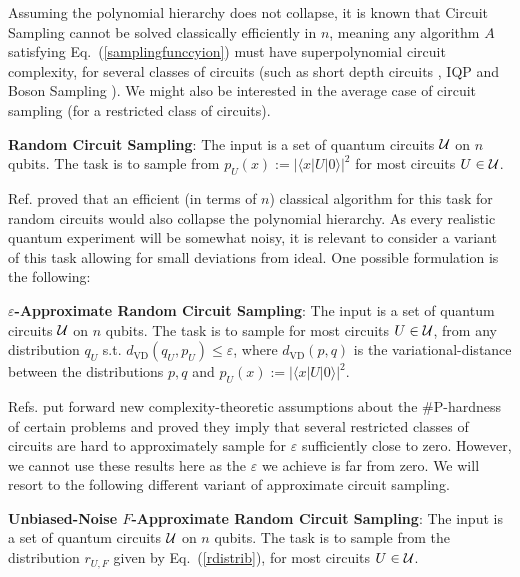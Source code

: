 Assuming the polynomial hierarchy does not collapse, it is known that Circuit Sampling cannot be solved classically efficiently in $n$, meaning any algorithm $A$ satisfying Eq.~(\ref{samplingfunccyion}) must have superpolynomial circuit complexity, for several classes of circuits (such as short depth circuits \cite{TD02}, IQP \cite{BJS10} and Boson Sampling \cite{AA11}). We might also be interested in the average case of circuit sampling (for a restricted class of circuits).

\vspace{0.2 cm}


\noindent \textbf{Random Circuit Sampling}: The input is a set of quantum circuits ${\cal U}$ on $n$ qubits. The task is to sample from $p_U(x) := |\langle x | U | 0 \rangle|^2$ for most circuits $U \in {\cal U}$. 

\vspace{0.2 cm}


Ref. \cite{Bou19} proved that an efficient (in terms of $n$) classical algorithm for this task for random circuits would also collapse the polynomial hierarchy. As every realistic quantum experiment will be somewhat noisy, it is relevant to consider a variant of this task allowing for small deviations from ideal. One possible formulation is the following:


\vspace{0.2 cm}


\noindent \textbf{$\varepsilon$-Approximate Random Circuit Sampling}: The input is a set of quantum circuits ${\cal U}$ on $n$ qubits. The task is to sample for most circuits $U \in {\cal U}$, from any distribution $q_U$ s.t. $d_{\text{VD}}(q_U, p_{U})\leq \varepsilon$, where $d_{\text{VD}}(p, q)$ is the variational-distance between the distributions $p, q$ \cite{Note2} and  $p_U(x) := |\langle x | U | 0 \rangle|^2$.
\vspace{0.2 cm}


Refs. \cite{AA11, BM16, boixo2018characterizing} put forward new complexity-theoretic assumptions about the $\#\text{P}$-hardness of certain problems and proved they imply that several restricted classes of circuits are hard to approximately sample for $\varepsilon$ sufficiently close to zero. However, we cannot use these results here as the $\varepsilon$ we achieve is far from zero. We will resort to the following different variant of approximate circuit sampling.

\vspace{0.2 cm}


\noindent \textbf{Unbiased-Noise $F$-Approximate Random Circuit Sampling}: The input is a set of quantum circuits ${\cal U}$ on $n$ qubits. The task is to sample from the distribution $r_{U, F}$ given by Eq.~(\ref{rdistrib}), for most circuits $U \in {\cal U}$.  

